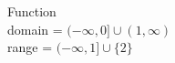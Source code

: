 {\noindent\begin{minipage}{\linewidth}\centering
{}
\end{minipage}}
{Function \\  domain =  $(-\infty, 0] \cup (1, \infty)$ \\ range =  $(-\infty, 1] \cup \{ 2\}$}
